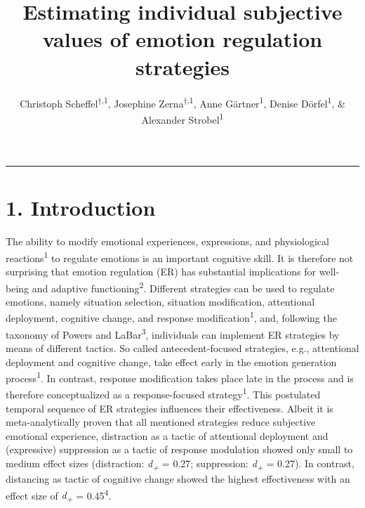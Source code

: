 \documentclass[
  english,
  man,floatsintext]{apa6}
\title{Estimating individual subjective values of emotion regulation strategies}
\author{Christoph Scheffel\textsuperscript{$\dagger{}$,1}, Josephine Zerna\textsuperscript{$\dagger{}$,1}, Anne Gärtner\textsuperscript{1}, Denise Dörfel\textsuperscript{1}, \& Alexander Strobel\textsuperscript{1}}
\date{}
\affiliation{\vspace{0.5cm}\textsuperscript{1} Faculty of Psychology, Technische Universität Dresden, 01069 Dresden, Germany}
\begin{document}
\maketitle

\renewcommand\thesection{\Alph{section}}
\setcounter{figure}{0}

\begin{center}\rule{0.5\linewidth}{0.5pt}\end{center}

\hypertarget{introduction}{%
\section{1. Introduction}\label{introduction}}

The ability to modify emotional experiences, expressions, and physiological reactions\textsuperscript{1} to regulate emotions is an important cognitive skill.
It is therefore not surprising that emotion regulation (ER) has substantial implications for well-being and adaptive functioning\textsuperscript{2}.
Different strategies can be used to regulate emotions, namely situation selection, situation modification, attentional deployment, cognitive change, and response modification\textsuperscript{1}, and, following the taxonomy of Powers and LaBar\textsuperscript{3}, individuals can implement ER strategies by means of different tactics.
So called antecedent-focused strategies, e.g., attentional deployment and cognitive change, take effect early in the emotion generation process\textsuperscript{1}.
In contrast, response modification takes place late in the process and is therefore conceptualized as a response-focused strategy\textsuperscript{1}.
This postulated temporal sequence of ER strategies influences their effectiveness.
Albeit it is meta-analytically proven that all mentioned strategies reduce subjective emotional experience, distraction as a tactic of attentional deployment and (expressive) suppression as a tactic of response modulation showed only small to medium effect sizes (distraction: \emph{d\textsubscript{+}} = 0.27; suppression: \emph{d\textsubscript{+}} = 0.27).
In contrast, distancing as tactic of cognitive change showed the highest effectiveness with an effect size of \emph{d\textsubscript{+}} = 0.45\textsuperscript{4}.
\end{document}
